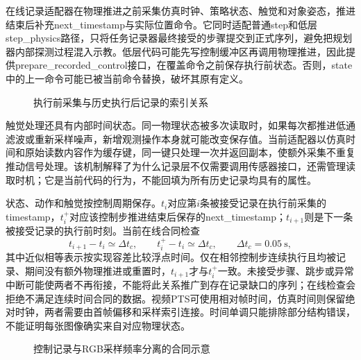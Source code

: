 在线记录适配器在物理推进之前采集仿真时钟、策略状态、触觉和对象姿态，推进结束后补充next\_timestamp与实际位置命令。它同时适配普通step和低层step\_physics路径，只将任务记录器最终接受的步骤提交到正式序列，避免把规划器内部探测过程混入示教。低层代码可能先写控制缓冲区再调用物理推进，因此提供prepare\_recorded\_control接口，在覆盖命令之前保存执行前状态。否则，state中的上一命令可能已被当前命令替换，破坏其原有定义。

\begin{figure}[htbp]
 \centering
 \caption{执行前采集与历史执行后记录的索引关系}
 \label{fig:ch04_timing}
\end{figure}

触觉处理还具有内部时间状态。同一物理状态被多次读取时，如果每次都推进低通滤波或重新采样噪声，新增观测操作本身就可能改变保存值。当前适配器以仿真时间和原始读数内容作为缓存键，同一键只处理一次并返回副本，使额外采集不重复推动信号处理。该机制解释了为什么记录层不仅需要调用传感器接口，还需管理读取时机；它是当前代码的行为，不能回填为所有历史记录均具有的属性。

状态、动作和触觉按控制周期保存。$t_i$对应第$i$条被接受记录在执行前采集的timestamp，$t_i^{+}$对应该控制步推进结束后保存的next\_timestamp；$t_{i+1}$则是下一条被接受记录的执行前时刻。当前在线合同检查
\begin{equation}
 t_{i+1}-t_i\simeq\Delta t_c,\qquad
 t_i^{+}-t_i\simeq\Delta t_c,\qquad \Delta t_c=0.05~\mathrm{s},
 \label{eq:ch04_time_interval}
\end{equation}
其中近似相等表示按实现容差比较浮点时间。仅在相邻控制步连续执行且均被记录、期间没有额外物理推进或重置时，$t_{i+1}$才与$t_i^{+}$一致。未接受步骤、跳步或异常中断可能使两者不再衔接，不能将此关系推广到存在记录缺口的序列；在线检查会拒绝不满足连续时间合同的数据。视频PTS可使用相对帧时间，仿真时间则保留绝对时钟，两者需要由首帧偏移和采样索引连接。时间单调只能排除部分结构错误，不能证明每张图像确实来自对应物理状态。

\begin{figure}[htbp]
 \centering
 \caption{控制记录与RGB采样频率分离的合同示意}
 \label{fig:ch04_multirate}
\end{figure}

